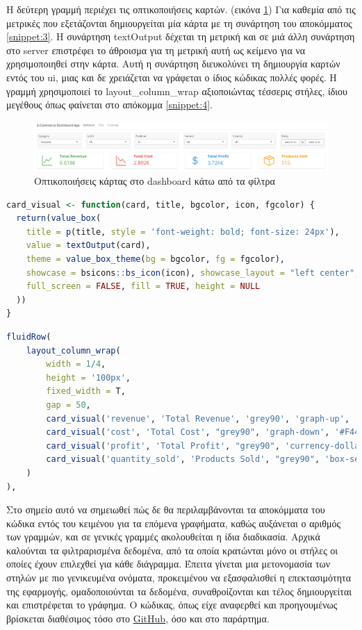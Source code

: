 \documentclass{article}
\begin{document}
Η δεύτερη γραμμή περιέχει τις οπτικοποιήσεις καρτών. (εικόνα \ref{fig:8}) Για καθεμία από τις μετρικές που εξετάζονται δημιουργείται μία κάρτα με τη συνάρτηση του αποκόμματος \ref{snippet:3}. Η συνάρτηση textOutput δέχεται τη μετρική και σε μιά άλλη συνάρτηση στο server επιστρέφει το άθροισμα για τη μετρική αυτή ως κείμενο για να χρησιμοποιηθεί στην κάρτα. Αυτή η συνάρτηση διευκολύνει τη δημιουργία καρτών εντός του ui, μιας και δε χρειάζεται να γράφεται ο ίδιος κώδικας πολλές φορές. Η γραμμή χρησιμοποιεί το layout\_column\_wrap αξιοποιώντας τέσσερις στήλες, ίδιου μεγέθους όπως φαίνεται στο απόκομμα \ref{snippet:4}.

\begin{figure}[h]
    \centering
    \includegraphics[width=\textwidth]{pictures/8_card_visuals.png}
    \caption{Οπτικοποιήσεις κάρτας στο dashboard κάτω από τα φίλτρα}
    \label{fig:8}
\end{figure}

\begin{lstlisting}[language=R, caption=Φιλτράρισμα δεδομένων, label={snippet:3}]
card_visual <- function(card, title, bgcolor, icon, fgcolor) {
  return(value_box(
    title = p(title, style = 'font-weight: bold; font-size: 24px'), 
    value = textOutput(card),
    theme = value_box_theme(bg = bgcolor, fg = fgcolor),
    showcase = bsicons::bs_icon(icon), showcase_layout = "left center",
    full_screen = FALSE, fill = TRUE, height = NULL
  ))
}
\end{lstlisting}

\begin{lstlisting}[language=R, caption=Φιλτράρισμα δεδομένων, label={snippet:4}]
fluidRow(
    layout_column_wrap(
        width = 1/4,
        height = '100px',
        fixed_width = T,
        gap = 50,
        card_visual('revenue', 'Total Revenue', 'grey90', 'graph-up', '#4CAF50'),
        card_visual('cost', 'Total Cost', "grey90", 'graph-down', '#F44336'),
        card_visual('profit', 'Total Profit', "grey90", 'currency-dollar', '#2196F3'),
        card_visual('quantity_sold', 'Products Sold', "grey90", 'box-seam', '#FF9800')
    )
),
\end{lstlisting}

Στο σημείο αυτό να σημειωθεί πώς δε θα περιλαμβάνονται τα αποκόμματα του κώδικα εντός του κειμένου για τα επόμενα γραφήματα, καθώς αυξάνεται ο αριθμός των γραμμών, και σε γενικές γραμμές ακολουθείται η ίδια διαδικασία. Αρχικά καλούνται τα φιλτραρισμένα δεδομένα, από τα οποία κρατώνται μόνο οι στήλες οι οποίες έχουν επιλεχθεί για κάθε διάγραμμα. Έπειτα γίνεται μια μετονομασία των στηλών με πιο γενικευμένα ονόματα, προκειμένου να εξασφαλισθεί η επεκτασιμότητα της εφαρμογής, ομαδοποιούνται τα δεδομένα, συναθροίζονται και τέλος δημιουργείται και επιστρέφεται το γράφημα. Ο κώδικας, όπως είχε αναφερθεί και προηγουμένως βρίσκεται διαθέσιμος τόσο στο \href{https://github.com/kostas-rigan/r-shiny-dashboard-app}{GitHub}, όσο και στο παράρτημα.
\end{document}
